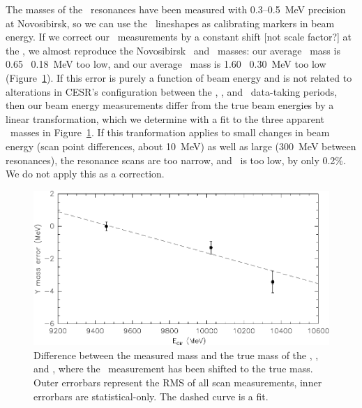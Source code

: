 \documentclass{cornell}
\begin{document}
The masses of the \ups\ resonances have been measured with
0.3--0.5~MeV precision at Novosibirsk, so we can use the \ups\
lineshapes as calibrating markers in beam energy.  If we correct our
\ecm\ measurements by a constant shift [not scale factor?] at the \us,
we almost reproduce the Novosibirsk \uss\ and \usss\ masses: our
average \uss\ mass is 0.65 \PM\ 0.18~MeV too low, and our average
\usss\ mass is 1.60 \PM\ 0.30~MeV too low
(Figure~\ref{energycalibration}).  If this error is purely a function
of beam energy and is not related to alterations in CESR's
configuration between the \usss, \us, and \uss\ data-taking periods,
then our beam energy measurements differ from the true beam energies
by a linear transformation, which we determine with a fit to the three
apparent \ups\ masses in Figure~\ref{energycalibration}.  If this
tranformation applies to small changes in beam energy (scan point
differences, about 10~MeV) as well as large (300~MeV between
resonances), the resonance scans are too narrow, and \geehadtot\ is
too low, by only 0.2\%.  We do not apply this as a correction.

\begin{figure}[p]
  \begin{center}
    \includegraphics[width=\linewidth]{plots/energycalibration}
  \end{center}
  \caption{\label{energycalibration} Difference between the measured
  mass and the true mass of the \us, \uss, and \usss, where the \us\
  measurement has been shifted to the true mass.  Outer errorbars
  represent the RMS of all scan measurements, inner errorbars are
  statistical-only.  The dashed curve is a fit.}
\end{figure}
\end{document}
